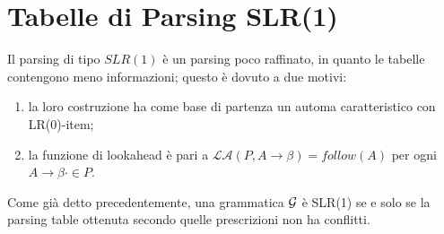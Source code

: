 \documentclass[class=book, crop=false, oneside, 12pt]{standalone}
\begin{document}
\section{Tabelle di Parsing SLR(1)}
Il parsing di tipo \(SLR(1)\) è un parsing poco raffinato, in quanto le tabelle contengono meno informazioni; questo è dovuto a due motivi:
\begin{enumerate}
    \item la loro costruzione ha come base di partenza un automa caratteristico con LR(0)-item;
    \item la funzione di lookahead è pari a \(\mathcal{LA}(P, A \rightarrow \beta) = follow(A)\) per ogni \(A \rightarrow \beta \cdot \in P\).
\end{enumerate}
Come già detto precedentemente, una grammatica \(\mathcal{G}\) è SLR(1) se e solo se la parsing table ottenuta secondo quelle prescrizioni non ha conflitti.
\end{document}
